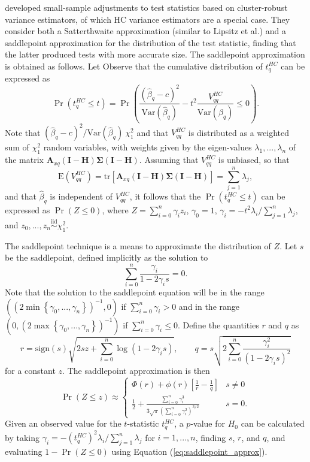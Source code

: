 \documentclass[12pt]{article}\usepackage[]{graphicx}\usepackage[]{color}
\newcommand{\E}{\text{E}}
\newcommand{\Var}{\text{Var}}
\newcommand{\tr}{\text{tr}}
\newcommand{\iid}{\stackrel{\text{iid}}{\sim}}
\newcommand{\bm}{\mathbf}
\newcommand{\bs}{\boldsymbol}
\begin{document}
\citet{McCaffrey2006improved} developed small-sample adjustments to test statistics based on cluster-robust variance estimators, of which HC variance estimators are a special case. They consider both a Satterthwaite approximation (similar to Lipsitz et al.) and a saddlepoint approximation for the distribution of the test statistic, finding that the latter produced tests with more accurate size. The saddlepoint approximation is obtained as follows. Let Observe that the cumulative distribution of $t^{HC}_q$ can be expressed as \[
\Pr\left(t^{HC}_q \leq t\right) = \Pr\left(\frac{\left(\hat\beta_q - c\right)^2}{\Var(\hat\beta_q)} - t^2 \frac{V^{HC}_{qq}}{\Var(\hat\beta_q)} \leq 0\right). \]
Note that $\left(\hat\beta_q - c\right)^2 / \Var(\hat\beta_q) ~ \chi^2_1$ and that $V^{HC}_{qq}$ is distributed as a weighted sum of $\chi^2_1$ random variables, with weights given by the eigen-values $\lambda_1,...,\lambda_n$ of the matrix $\bm{A}_{xq} \left(\bm{I} - \bm{H}\right)\bs\Sigma\left(\bm{I} - \bm{H}\right)$. Assuming that $V^{HC}_{qq}$ is unbiased, so that \[
\E\left(V^{HC}_{qq}\right) = \tr\left[\bm{A}_{xq} \left(\bm{I} - \bm{H}\right)\bs\Sigma\left(\bm{I} - \bm{H}\right)\right] = \sum_{j=1}^n \lambda_j, \]
and that $\hat\beta_q$ is independent of $V^{HC}_{qq}$, it follows that the $\Pr\left(t^{HC}_q \leq t\right)$ can be expressed as $\Pr(Z \leq 0)$, where $Z = \sum_{i=0}^n \gamma_i z_i$,
$\gamma_0 = 1$, $\gamma_i = -t^2 \lambda_i / \sum_{j=1}^n \lambda_j$, and $z_0,...,z_n \iid \chi^2_1$.

The saddlepoint technique is a means to approximate the distribution of $Z$. Let $s$ be the saddlepoint, defined implicitly as the solution to \[
\sum_{i=0}^n \frac{\gamma_i}{1 - 2 \gamma_i s} = 0. \]
Note that the solution to the saddlepoint equation will be in the range $\left(\left(2 \min\left\{\gamma_0,...,\gamma_n\right\}\right)^{-1}, 0 \right)$ if $\sum_{i=0}^n \gamma_i > 0$ and in the range $\left(0, \left(2 \max\left\{\gamma_0,...,\gamma_n\right\}\right)^{-1}\right)$ if $\sum_{i=0}^n \gamma_i \leq 0$. Define the quantities $r$ and $q$ as \[
r = \text{sign}(s)\sqrt{2sz + \sum_{i=0}^n \log\left(1 - 2\gamma_i s\right)}, \qquad q = s \sqrt{2 \sum_{i=0}^n \frac{\gamma_i^2}{\left(1 - 2 \gamma_i s\right)^2}} \]
for a constant $z$. The saddlepoint approximation is then 
\begin{equation}
\label{eq:saddlepoint_approx}
\Pr(Z \leq z) \approx \begin{cases}\Phi(r) + \phi(r)\left[\frac{1}{r} - \frac{1}{q}\right] & s \neq 0 \\
\frac{1}{2} + \frac{\sum_{i=0}^n \gamma_i^3}{3 \sqrt\pi \left(\sum_{i=0}^n \gamma_i^2\right)^{3/2}} & s = 0. \end{cases}
\end{equation}
Given an observed value for the $t$-statistic $t^{HC}_q$, a $p$-value for $H_0$ can be calculated by taking $\gamma_i = -\left(t^{HC}_q\right)^2 \lambda_i / \sum_{j=1}^n \lambda_j$ for $i = 1,...,n$, finding $s$, $r$, and $q$, and evaluating $1 - \Pr(Z \leq 0)$ using Equation (\ref{eq:saddlepoint_approx}).
\end{document}
